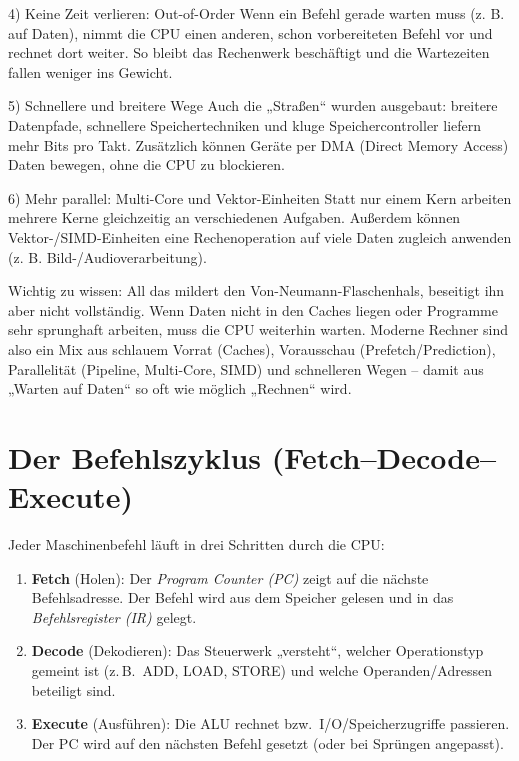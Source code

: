 \documentclass[../skript/main.tex]{subfiles}
\begin{document}
4) Keine Zeit verlieren: Out-of-Order
Wenn ein Befehl gerade warten muss (z. B. auf Daten), nimmt die CPU einen anderen, schon vorbereiteten Befehl vor und rechnet dort weiter. So bleibt das Rechenwerk beschäftigt und die Wartezeiten fallen weniger ins Gewicht.

5) Schnellere und breitere Wege
Auch die „Straßen“ wurden ausgebaut: breitere Datenpfade, schnellere Speichertechniken und kluge Speichercontroller liefern mehr Bits pro Takt. Zusätzlich können Geräte per DMA (Direct Memory Access) Daten bewegen, ohne die CPU zu blockieren.

6) Mehr parallel: Multi-Core und Vektor-Einheiten
Statt nur einem Kern arbeiten mehrere Kerne gleichzeitig an verschiedenen Aufgaben. Außerdem können Vektor-/SIMD-Einheiten eine Rechenoperation auf viele Daten zugleich anwenden (z. B. Bild-/Audioverarbeitung).

Wichtig zu wissen:
All das mildert den Von-Neumann-Flaschenhals, beseitigt ihn aber nicht vollständig. Wenn Daten nicht in den Caches liegen oder Programme sehr sprunghaft arbeiten, muss die CPU weiterhin warten. Moderne Rechner sind also ein Mix aus schlauem Vorrat (Caches), Vorausschau (Prefetch/Prediction), Parallelität (Pipeline, Multi-Core, SIMD) und schnelleren Wegen – damit aus „Warten auf Daten“ so oft wie möglich „Rechnen“ wird.





\section{Der Befehlszyklus (Fetch–Decode–Execute)}
Jeder Maschinenbefehl läuft in drei Schritten durch die CPU:
\begin{enumerate}
	\item \textbf{Fetch} (Holen): Der \emph{Program Counter (PC)} zeigt auf die nächste Befehlsadresse.
	Der Befehl wird aus dem Speicher gelesen und in das \emph{Befehlsregister (IR)} gelegt.
	\item \textbf{Decode} (Dekodieren): Das Steuerwerk „versteht“, welcher Operationstyp gemeint ist
	(z.\,B.\ ADD, LOAD, STORE) und welche Operanden/Adressen beteiligt sind.
	\item \textbf{Execute} (Ausführen): Die ALU rechnet bzw.\ I/O/Speicherzugriffe passieren.
	Der PC wird auf den nächsten Befehl gesetzt (oder bei Sprüngen angepasst).
\end{enumerate}
\end{document}
